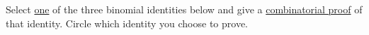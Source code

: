 \documentclass[11pt]{exam}
\begin{document}
\begin{questions}
%
%

\newpage

\question[24] Select \underline{one} of the three binomial identities below and give a \underline{combinatorial proof} of that identity.  Circle which identity you choose to prove.
\begin{parts}

\end{parts}
\end{questions}
\end{document}

